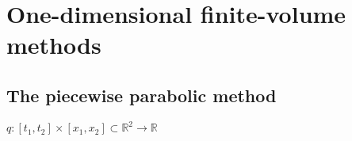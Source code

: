 
\chapter{One-dimensional finite-volume methods}

\section{The piecewise parabolic method}
$q: [t_1, t_2] \times [x_1, x_2] \subset \mathbb{R}^2 \to \mathbb{R}$

